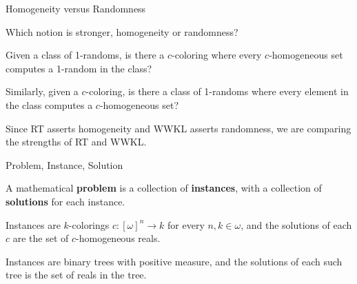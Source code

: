 \begin{frame}{Homogeneity versus Randomness}
  \begin{goal*}
    Which notion is stronger, homogeneity or randomness?
  \end{goal*}

  \pause
  \vspace{2em}
  Given a class of 1-randoms, is there a $c$-coloring where every
  $c$-homogeneous set computes a 1-random in the class?

  \pause
  \vspace{2em}
  Similarly, given a $c$-coloring, is there a class of 1-randoms where
  every element in the class computes a $c$-homogeneous set?

  \pause
  \vspace{2em}
  Since RT asserts homogeneity and WWKL asserts randomness, we are
  comparing the strengths of RT and WWKL.
\end{frame}

\begin{frame}{Problem, Instance, Solution}
  \begin{define*}
    A mathematical \textbf{problem} is a collection of \textbf{instances},
    with a collection of \textbf{solutions} for each instance.
  \end{define*}

  \pause
  \vspace{2em}
  \begin{example*}[RT is a problem]
    Instances are $k$-colorings $c:[\omega]^n\rightarrow k$ for every
    $n,k\in\omega$, and the solutions of each $c$ are the set of
    $c$-homogeneous reals.
  \end{example*}

  \pause
  \vspace{2em}
  \begin{example*}
    Instances are binary trees with positive measure, and the solutions of
    each such tree is the set of reals in the tree.
  \end{example*}
\end{frame}

